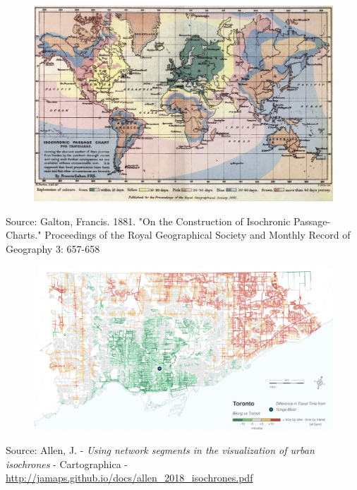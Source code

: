 \documentclass[aspectratio=169]{beamer}
\begin{document}
\begin{frame}
	
	
	\begin{figure}
		\centering
		\includegraphics[width=0.8\linewidth]{images/Isochronic_Galton_1881}
	\end{figure}
	\tiny	Source:  Galton,   Francis.   1881.   "On   the   Construction   of   Isochronic   Passage-Charts." Proceedings  of  the  Royal  Geographical  Society  and Monthly Record of Geography 3: 657-658
\end{frame}




\begin{frame}
	
	\begin{figure}
		\centering
		\includegraphics[width=1\linewidth]{images/bike_vs_transit}
	\end{figure}
	
	\tiny Source: Allen, J. - \textit{Using network segments in the visualization of urban isochrones} -  Cartographica - \url{http://jamaps.github.io/docs/allen_2018_isochrones.pdf}
	
\end{frame}
\end{document}
